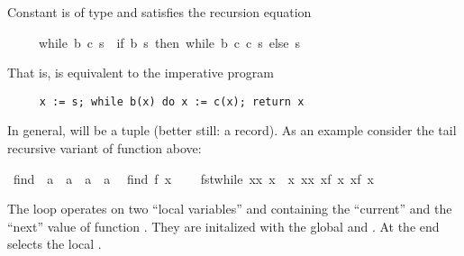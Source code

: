 \begin{isabellebody}
\begin{isamarkuptext}
Constant  is of type 
and satisfies the recursion equation \begin{isabelle}%
\ \ \ \ \ while\ b\ c\ s\ {\isacharequal}\ {\isacharparenleft}if\ b\ s\ then\ while\ b\ c\ {\isacharparenleft}c\ s{\isacharparenright}\ else\ s{\isacharparenright}%
\end{isabelle}
That is,  is equivalent to the imperative program
\begin{verbatim}
     x := s; while b(x) do x := c(x); return x
\end{verbatim}
In general,  will be a tuple (better still: a record). As an example
consider the tail recursive variant of function  above:%
\end{isamarkuptext}%
\ find{}\ {\isacharcolon}{\isacharcolon}\ {\isachardoublequote}{\isacharparenleft}{\isacharprime}a\ {\isasymRightarrow}\ {\isacharprime}a{\isacharparenright}\ {\isasymRightarrow}\ {\isacharprime}a\ {\isasymRightarrow}\ {\isacharprime}a{\isachardoublequote}\isanewline
\ \ {\isachardoublequote}find{}\ f\ x\ {\isasymequiv}\isanewline
\ \ \ fst{\isacharparenleft}while\ {\isacharparenleft}{\isasymlambda}{\isacharparenleft}x{\isacharcomma}x{\isacharprime}{\isacharparenright}{\isachardot}\ x{\isacharprime}\ {\isasymnoteq}\ x{\isacharparenright}\ {\isacharparenleft}{\isasymlambda}{\isacharparenleft}x{\isacharcomma}x{\isacharprime}{\isacharparenright}{\isachardot}\ {\isacharparenleft}x{\isacharprime}{\isacharcomma}f\ x{\isacharprime}{\isacharparenright}{\isacharparenright}\ {\isacharparenleft}x{\isacharcomma}f\ x{\isacharparenright}{\isacharparenright}{\isachardoublequote}%
\begin{isamarkuptext}%
\noindent
The loop operates on two ``local variables''  and 
containing the ``current'' and the ``next'' value of function .
They are initalized with the global  and . At the
end  selects the local .


\end{isamarkuptext}
\end{isabellebody}
